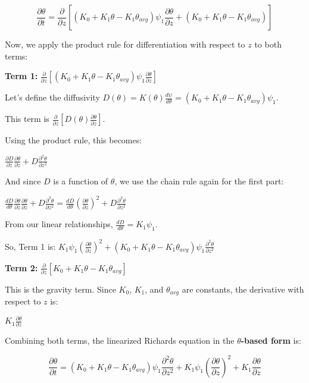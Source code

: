 \documentclass[
]{article}
\begin{document}
\[\frac{\partial \theta}{\partial t} = \frac{\partial}{\partial z} \left[ (K_0 + K_1 \theta - K_1 \theta_{avg}) \psi_1 \frac{\partial \theta}{\partial z} + (K_0 + K_1 \theta - K_1 \theta_{avg}) \right]\]

Now, we apply the product rule for differentiation with respect to \(z\)
to both terms:

\textbf{Term 1:}
\(\frac{\partial}{\partial z} \left[ (K_0 + K_1 \theta - K_1 \theta_{avg}) \psi_1 \frac{\partial \theta}{\partial z} \right]\)

Let's define the diffusivity
\(D(\theta) = K(\theta) \frac{d\psi}{d\theta} = (K_0 + K_1 \theta - K_1 \theta_{avg}) \psi_1\).

This term is
\(\frac{\partial}{\partial z} \left[ D(\theta) \frac{\partial \theta}{\partial z} \right]\).

Using the product rule, this becomes:

\(\frac{\partial D}{\partial z} \frac{\partial \theta}{\partial z} + D \frac{\partial^2 \theta}{\partial z^2}\)

And since \(D\) is a function of \(\theta\), we use the chain rule again
for the first part:

\(\frac{dD}{d\theta} \frac{\partial \theta}{\partial z} \frac{\partial \theta}{\partial z} + D \frac{\partial^2 \theta}{\partial z^2} = \frac{dD}{d\theta} \left( \frac{\partial \theta}{\partial z} \right)^2 + D \frac{\partial^2 \theta}{\partial z^2}\)

From our linear relationships, \(\frac{dD}{d\theta} = K_1 \psi_1\).

So, Term 1 is:
\(K_1 \psi_1 \left( \frac{\partial \theta}{\partial z} \right)^2 + (K_0 + K_1 \theta - K_1 \theta_{avg}) \psi_1 \frac{\partial^2 \theta}{\partial z^2}\)

\textbf{Term 2:}
\(\frac{\partial}{\partial z} \left[ K_0 + K_1 \theta - K_1 \theta_{avg} \right]\)

This is the gravity term. Since \(K_0\), \(K_1\), and \(\theta_{avg}\)
are constants, the derivative with respect to \(z\) is:

\(K_1 \frac{\partial \theta}{\partial z}\)

Combining both terms, the linearized Richards equation in the
\textbf{\(\theta\)-based form} is:

\[\frac{\partial \theta}{\partial t} = (K_0 + K_1 \theta - K_1 \theta_{avg}) \psi_1 \frac{\partial^2 \theta}{\partial z^2} + K_1 \psi_1 \left( \frac{\partial \theta}{\partial z} \right)^2 + K_1 \frac{\partial \theta}{\partial z}\]
\end{document}
